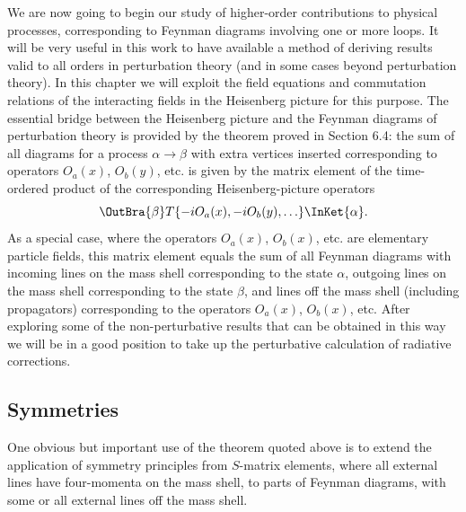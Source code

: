
We are now going to begin our study of higher-order contributions to
physical processes, corresponding to Feynman diagrams involving one or
more loops. It will be very useful in this work to have available a method
of deriving results valid to all orders in perturbation theory (and in some
cases beyond perturbation theory). In this chapter we will exploit the
field equations and commutation relations of the interacting fields in the
Heisenberg picture for this purpose. The essential bridge between the
Heisenberg picture and the Feynman diagrams of perturbation theory is
provided by the theorem proved in Section 6.4: the sum of all diagrams for
a process $\alpha\to\beta$ with extra vertices inserted corresponding to operators
$O_a(x)$, $O_b(y)$, etc. is given by the matrix element of the time-ordered product
of the corresponding Heisenberg-picture operators
\[
  \OutBra{\beta}
  T\{-iO_a(x),-iO_b(y),\ldots\}
  \InKet{\alpha}.
\]
As a special case, where the operators $O_a(x)$, $O_b(x)$, etc. are elementary
particle fields, this matrix element equals the sum of all Feynman diagrams
with incoming lines on the mass shell corresponding to the state $\alpha$,
outgoing lines on the mass shell corresponding to the state $\beta$, and lines
off the mass shell (including propagators) corresponding to the operators
$O_a(x)$, $O_b(x)$, etc. After exploring some of the non-perturbative results
that can be obtained in this way we will be in a good position to take up
the perturbative calculation of radiative corrections.

\subsection{Symmetries}

One obvious but important use of the theorem quoted above is to extend
the application of symmetry principles from $S$-matrix elements, where all
external lines have four-momenta on the mass shell, to parts of Feynman
diagrams, with some or all external lines off the mass shell.

